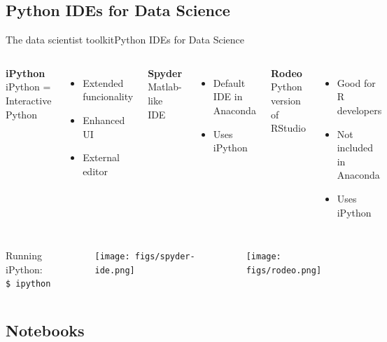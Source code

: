 \documentclass[10pt,compress]{beamer} %
\begin{document}
\subsection{Python IDEs for Data Science}
\begin{frame}[t]{The data scientist toolkit}{Python IDEs for Data Science}
    \begin{columns}[t]
	   \centering \textbf{iPython}\\
	   	iPython = Interactive Python\\
   		\begin{itemize}
		\item Extended funcionality
		\item Enhanced UI
		\item External editor
		\end{itemize}

	   \centering \textbf{Spyder}\\
		Matlab-like IDE\\
		\begin{itemize}
			\item Default IDE in Anaconda
			\item Uses iPython
		\end{itemize}

	   \centering \textbf{Rodeo}\\
		Python version of RStudio\\
		\begin{itemize}
			\item Good for R developers
			\item Not included in Anaconda
			\item Uses iPython
		\end{itemize}
	\end{columns}

	\bigskip

    \begin{columns}
		Running iPython:\\
		\texttt{\$ ipython}

		\texttt{[image: figs/spyder-ide.png]}	

		\texttt{[image: figs/rodeo.png]}	
	\end{columns}
\end{frame}

\subsection{Notebooks}
\end{document}
